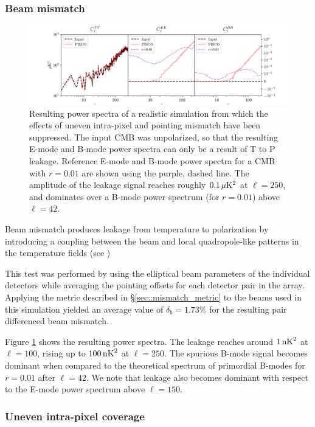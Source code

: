 \documentclass[a4paper,11pt]{article}
\begin{document}
\subsubsection{Beam mismatch}

\begin{figure}
	\centering
	\includegraphics[width=1\textwidth]{figures/beamMismatch.pdf}
	\caption{Resulting power spectra of a realistic simulation from which the effects of uneven intra-pixel and pointing mismatch have been suppressed. The input CMB was unpolarized, so that the resulting E-mode and B-mode power spectra can only be a result of T to P leakage. Reference E-mode and B-mode power spectra for a CMB with $r=0.01$ are shown using the purple, dashed line. The amplitude of the leakage signal reaches roughly $0.1\, \mu\rm{K}^2$ at $\ell=250$, and dominates over a B-mode power spectrum (for $r=0.01$) above $\ell=42$.}
	\label{fig::pisco4class_beammismatch}
\end{figure}

Beam mismatch produces leakage from temperature to polarization by introducing a coupling between the beam and local quadropole-like patterns in the temperature fields (see \cite{2007MNRAS.376.1767O}) 

This test was performed by using the elliptical beam parameters of the individual detectors while averaging the pointing offsets for each detector pair in the array. Applying the metric described in \S\ref{sec::mismatch_metric} to the beams used in this simulation yielded an average value of  $\delta_b = 1.73\%$ for the resulting pair differenced beam mismatch. 

Figure \ref{fig::pisco4class_beammismatch} shows the resulting power spectra. The leakage reaches around $1\, \rm{nK}^2$ at $\ell=100$, rising up to $100 \, \rm{nK}^2$ at $\ell=250$. The spurious B-mode signal becomes dominant when compared to the theoretical spectrum of primordial B-modes for $r=0.01$ after $\ell=42$. We note that leakage also becomes dominant with respect to the E-mode power spectrum above $\ell=150$. 

\subsubsection{Uneven intra-pixel coverage}
\end{document}
